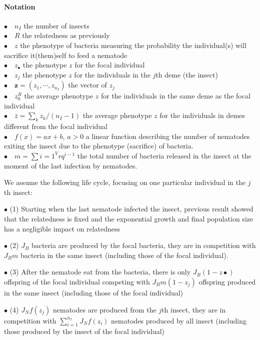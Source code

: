 \documentclass{article}
\begin{document}
  \paragraph{Notation} $ $\\
 $\bullet \quad n_I$ the number of insects \\
 $\bullet \quad R$ the relatedness as previously \\
 $\bullet \quad z$ the phenotype of bacteria measuring the probability the individual(s) will sacrifice it(them)self to feed a nematode\\
 $\bullet \quad z_\bullet $ the phenotype $z$ for the focal individual\\
 $\bullet \quad z_j$ the phenotype $z$ for the individuals in the $j$th deme (the insect)\\
 $\bullet \quad \mathbf{z}=(z_1,\cdots,z_{n_I})$ the vector of $z_j$\\
 $\bullet \quad z_0^R$ the average phenotype $z$ for the individuals in the same deme as the focal individual\\
 $\bullet \quad \bar{z}=\sum_k z_k / (n_I -1) $ the average phenotype $z$ for the individuals in demes different from the focal individual\\
 $\bullet \quad f (x)=ax+b$, $a>0$ a linear function describing the number of nematodes exiting the insect due to the phenotype (sacrifice) of bacteria.\\
 $\bullet \quad m=\sum{i=1}^V r q^{i-1}$ the total number of bacteria released in the insect at the moment of the last infection by nematodes.
 
 We assume the following life cycle, focusing on one particular individual in the $j$th insect:
 
 
 $\bullet$ (1) Starting when the last nematode infected the insect, previous result showed that the relatedness is fixed and the exponential growth and final population size has a negligible impact on relatedness
 
 
 $\bullet$ (2) $J_B$ bacteria are produced by the focal bacteria, they are in competition with $J_B m$ bacteria in the same insect (including those of the focal individual).
 
 
 $\bullet$ (3) After the nematode eat from the bacteria, there is only $J_B(1-z\bullet)$ offspring of the focal individual competing with $J_B m (1-z_j)$ offspring produced in the same insect (including those of the focal individual)
 
 
 $\bullet$ (4) $J_N f(z_j)$ nematodes are produced from the $j$th insect, they are in competition with $\sum_{i=1}^{n_I} J_N f(z_i)$ nematodes produced by all insect (including those produced by the insect of the focal individual)
 
\end{document}
